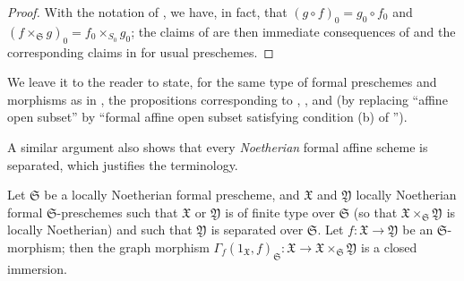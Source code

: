 \begin{proof}
With the notation of , we have, in fact, that $(g\circ f)_0=g_0\circ f_0$ and $(f\times_\mathfrak{S}g)_0=f_0\times_{S_0}g_0$;
the claims of  are then immediate consequences of  and the corresponding claims in  for usual preschemes.
\end{proof}

We leave it to the reader to state, for the same type of formal preschemes and morphisms as in , the propositions corresponding to , , and 
(by replacing ``affine open subset'' by ``formal affine open subset satisfying condition (b) of '').

A similar argument also shows that every \emph{Noetherian} formal affine scheme is separated, which justifies the terminology.

\begin{proposition}[10.15.4]
\label{I.10.15.4}
Let $\mathfrak{S}$ be a locally Noetherian formal prescheme, and $\mathfrak{X}$ and $\mathfrak{Y}$ locally Noetherian formal $\mathfrak{S}$-preschemes such that $\mathfrak{X}$ or $\mathfrak{Y}$ is of finite type over $\mathfrak{S}$ (so that $\mathfrak{X}\times_\mathfrak{S}\mathfrak{Y}$ is locally Noetherian) and such that $\mathfrak{Y}$ is separated over $\mathfrak{S}$.
Let $f:\mathfrak{X}\to\mathfrak{Y}$ be an $\mathfrak{S}$-morphism; then the graph morphism $\Gamma_f(1_\mathfrak{X},f)_\mathfrak{S}:\mathfrak{X}\to\mathfrak{X}\times_\mathfrak{S}\mathfrak{Y}$ is a closed immersion.
\end{proposition}

